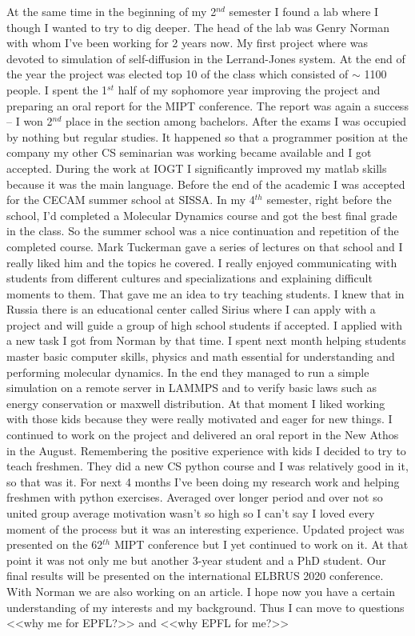 \documentclass[11pt, a4paper]{awesome-cv}
\begin{document}
\begin{cvletter}
At the same time in the beginning of my 2$^{nd}$ semester I found a lab where I though I wanted to try to dig deeper. The head of the lab was Genry Norman with whom I've been working for 2 years now. My first project where was devoted to simulation of self-diffusion in the Lerrand-Jones system. At the end of the year the project was elected top 10 of the class which consisted of $\sim$ 1100 people. I spent the 1$^{st}$ half of my sophomore year improving the project and preparing an oral report for the MIPT conference. The report was again a success -- I won 2$^{nd}$ place in the section among bachelors. After the exams I was occupied by nothing but regular studies. It happened so that a programmer position at the company my other CS seminarian was working became available and I got accepted. During the work at IOGT I significantly improved my matlab skills because it was the main language. Before the end of the academic I was accepted for the CECAM summer school at SISSA. In my 4$^{th}$ semester, right before the school, I'd completed a Molecular Dynamics course and got the best final grade in the class. So the summer school was a nice continuation and repetition of the completed course. Mark Tuckerman gave a series of lectures on that school and I really liked him and the topics he covered. I really enjoyed communicating with students from different cultures and specializations and explaining difficult moments to them. That gave me an idea to try teaching students. I knew that in Russia there is an educational center called Sirius where I can apply with a project and will guide a group of high school students if accepted. I applied with a new task I got from Norman by that time. I spent next month helping students master basic computer skills, physics and math essential for understanding and performing molecular dynamics. In the end they managed to run a simple simulation on  a remote server in LAMMPS and to verify basic laws such as energy conservation or maxwell distribution. At that moment I liked working with those kids because they were really motivated and eager for new things. I continued to work on the project and delivered an oral report in the New Athos in the August. Remembering the positive experience with kids I decided to try to teach freshmen. They did a new CS python course and I was relatively good in it, so that was it. For next 4 months I've been doing my research work and helping freshmen with python exercises. Averaged over longer period and over not so united group average motivation wasn't so high so I can't say I loved every moment of the process but it was an interesting experience. Updated project was presented on the 62$^{th}$ MIPT conference but I yet continued to work on it. At that point it was not only me but another 3-year student and a PhD student. Our final results will be presented on the international ELBRUS 2020 conference. With Norman we are also working on an article. I hope now you have a certain understanding of my interests and my background. Thus I can move to questions <<why me for EPFL?>> and <<why EPFL for me?>>


\end{cvletter}
\end{document}
